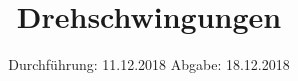 

\subject{Nr. 102}
\title{Drehschwingungen}
\date{%
  Durchführung: 11.12.2018
  \hspace{3em}
  Abgabe: 18.12.2018
}



\maketitle
\thispagestyle{empty}
\tableofcontents
\newpage






\printbibliography{}



